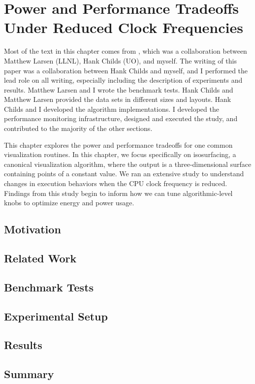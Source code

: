 \chapter{Power and Performance Tradeoffs Under Reduced Clock Frequencies}
\label{ch:ldav}

Most of the text in this chapter comes from \cite{7348074}, which was a
collaboration between Matthew Larsen (LLNL), Hank Childs (UO), and myself.
%
The writing of this paper was a collaboration between Hank Childs and myself,
and I performed the lead role on all writing, especially including the
description of experiments and results.
%
Matthew Larsen and I wrote the benchmark tests.
%
Hank Childs and Matthew Larsen provided the data sets in different sizes and
layouts.
%
Hank Childs and I developed the algorithm implementations.
%
I developed the performance monitoring infrastructure, designed and executed
the study, and contributed to the majority of the other sections.

This chapter explores the power and performance tradeoffs for one common
visualization routines.
%
In this chapter, we focus specifically on isosurfacing, a canonical
visualization algorithm, where the output is a three-dimensional surface
containing points of a constant value.
%
We ran an extensive study to understand changes in execution behaviors when the
CPU clock frequency is reduced.
%
Findings from this study begin to inform how we can tune algorithmic-level knobs
to optimize energy and power usage.

\section{Motivation}


\section{Related Work}
\label{sec:ch2-relwork}


\section{Benchmark Tests}
\label{sec:ch2-benchmarks}


\section{Experimental Setup}


\section{Results}


\section{Summary}

